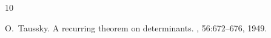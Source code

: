 \begin{thebibliography}{10}

O.~Taussky.
\newblock A recurring theorem on determinants.
, 56:672--676, 1949.

\end{thebibliography}
